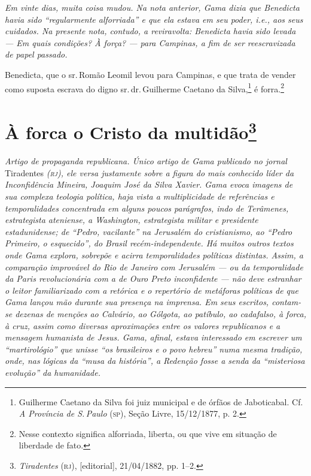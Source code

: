 \begin{resumo}
\emph{Em vinte dias, muita coisa mudou. Na nota anterior, Gama dizia que
Benedicta havia sido ``regularmente alforriada'' e que ela estava em seu
poder, i.e., aos seus cuidados. Na presente nota, contudo, a
reviravolta: Benedicta havia sido levada --- Em quais condições? À força?
--- para Campinas, a fim de ser reescravizada de papel passado.}
\end{resumo}

Benedicta, que o sr.\,Romão Leomil levou para Campinas, e que trata de
vender como suposta escrava do digno sr.\,dr.\,Guilherme Caetano da
Silva,\footnote{Guilherme Caetano da Silva foi juiz municipal e de
  órfãos de Jaboticabal. Cf. \emph{A Província de S.\,Paulo} (\textsc{sp}), Seção
  Livre, 15/12/1877, p. 2.} é forra.\footnote{Nesse contexto significa
  alforriada, liberta, ou que vive em situação de liberdade de fato.}

\chapter{À forca o Cristo da multidão\footnote{
\emph{Tiradentes} (\textsc{rj}), {[}editorial{]}, 21/04/1882, pp. 1--2.}}

\begin{resumo}
\emph{Artigo de propaganda republicana. Único artigo de Gama publicado
no jornal} Tiradentes \emph{(\textsc{rj}), ele versa justamente sobre a figura do
mais conhecido líder da Inconfidência Mineira, Joaquim José da Silva
Xavier. Gama evoca imagens de sua complexa teologia política, haja vista
a multiplicidade de referências e temporalidades concentrada em alguns
poucos parágrafos, indo de Terâmenes, estrategista ateniense, a
Washington, estrategista militar e presidente estadunidense; de ``Pedro,
vacilante'' na Jerusalém do cristianismo, ao ``Pedro Primeiro, o
esquecido'', do Brasil recém-independente. Há muitos outros textos onde
Gama explora, sobrepõe e acirra temporalidades políticas distintas.
Assim, a comparação improvável do Rio de Janeiro com Jerusalém --- ou da
temporalidade da Paris revolucionária com a de Ouro Preto inconfidente
--- não deve estranhar o leitor familiarizado com a retórica e o
repertório de metáforas políticas de que Gama lançou mão durante sua
presença na imprensa. Em seus escritos, contam-se dezenas de menções ao
Calvário, ao Gólgota, ao patíbulo, ao cadafalso, à forca, à cruz, assim
como diversas aproximações entre os valores republicanos e a mensagem
humanista de Jesus. Gama, afinal, estava interessado em escrever um
``martirológio'' que unisse ``os brasileiros e o povo hebreu'' numa mesma
tradição, onde, nas lógicas da ``musa da história'', a Redenção fosse a
senda da ``misteriosa evolução'' da humanidade. }
\end{resumo}

